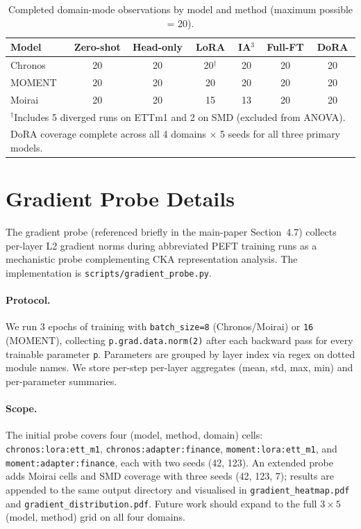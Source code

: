 \begin{table}[ht]
\centering
\caption{Completed domain-mode observations by model and method (maximum possible = 20).}
\label{tab:seed-coverage}
\small
\begin{tabular}{lcccccc}
\toprule
Model & Zero-shot & Head-only & LoRA & IA$^3$ & Full-FT & DoRA \\
\midrule
Chronos & 20 & 20 & 20$^\dagger$ & 20 & 20 & 20 \\
MOMENT & 20 & 20 & 20 & 20 & 20 & 20 \\
Moirai & 20 & 20 & 15 & 13 & 20 & 20 \\
\multicolumn{7}{l}{\scriptsize $^\dagger$Includes 5 diverged runs on ETTm1 and 2 on SMD (excluded from ANOVA).} \\
\multicolumn{7}{l}{\scriptsize DoRA coverage complete across all 4 domains $\times$ 5 seeds for all three primary models.} \\
\bottomrule
\end{tabular}
\end{table}

\section{Gradient Probe Details}
\label{sec:gradient-probe}
The gradient probe (referenced briefly in the main-paper Section~4.7) collects per-layer L2 gradient norms during abbreviated PEFT training runs as a mechanistic probe complementing CKA representation analysis. The implementation is \texttt{scripts/gradient\_probe.py}.

\paragraph{Protocol.} We run 3 epochs of training with \texttt{batch\_size=8} (Chronos/Moirai) or \texttt{16} (MOMENT), collecting \texttt{p.grad.data.norm(2)} after each backward pass for every trainable parameter \texttt{p}. Parameters are grouped by layer index via regex on dotted module names. We store per-step per-layer aggregates (mean, std, max, min) and per-parameter summaries.

\paragraph{Scope.} The initial probe covers four (model, method, domain) cells: \texttt{chronos:lora:ett\_m1}, \texttt{chronos:adapter:finance}, \texttt{moment:lora:ett\_m1}, and \texttt{moment:adapter:finance}, each with two seeds (42, 123). An extended probe adds Moirai cells and SMD coverage with three seeds (42, 123, 7); results are appended to the same output directory and visualised in \texttt{gradient\_heatmap.pdf} and \texttt{gradient\_distribution.pdf}. Future work should expand to the full $3{\times}5$ (model, method) grid on all four domains.

